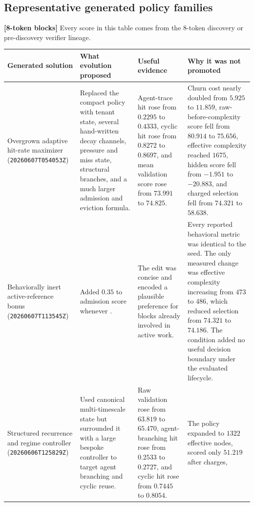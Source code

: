 \documentclass[11pt]{article}
\newcommand{\code}[1]{\texttt{\detokenize{#1}}}
\newcommand{\identifier}[1]{\nolinkurl{#1}}
\newcommand{\blocktag}[1]{\textbf{\color{navy}[#1-token blocks]}}
\begin{document}
\subsection{Representative generated policy families}

\blocktag{8} Every score in this table comes from the 8-token discovery or
pre-discovery verifier lineage.

\begin{center}
\footnotesize
\begin{tabularx}{\textwidth}{@{}>{\raggedright\arraybackslash}p{}
  >{\raggedright\arraybackslash}X
  >{\raggedright\arraybackslash}X
  >{\raggedright\arraybackslash}X@{}}
\toprule
\textbf{Generated solution} & \textbf{What evolution proposed} &
\textbf{Useful evidence} & \textbf{Why it was not promoted} \\
\midrule
Overgrown adaptive hit-rate maximizer
(\identifier{20260607T054053Z}) &
Replaced the compact policy with tenant state, several hand-written decay channels,
pressure and miss state, structural branches, and a much larger admission and eviction
formula. &
Agent-trace hit rose from \(0.2295\) to \(0.4333\), cyclic hit rose from \(0.8272\) to
\(0.8697\), and mean validation score rose from \(73.991\) to \(74.825\). &
Churn cost nearly doubled from \(5.925\) to \(11.859\), raw-before-complexity score
fell from \(80.914\) to \(75.656\), effective complexity reached \(1675\), hidden score
fell from \(-1.951\) to \(-20.883\), and charged selection fell from \(74.321\) to
\(58.638\). \\
\addlinespace
Behaviorally inert active-reference bonus
(\identifier{20260607T113545Z}) &
Added \(0.35\) to admission score whenever \code{active_ref_count > 0}. &
The edit was concise and encoded a plausible preference for blocks already involved in
active work. &
Every reported behavioral metric was identical to the seed.  The only measured change
was effective complexity increasing from \(473\) to \(486\), which reduced selection
from \(74.321\) to \(74.186\).  The condition added no useful decision boundary under
the evaluated lifecycle. \\
\addlinespace
Structured recurrence and regime controller
(\identifier{20260606T125829Z}) &
Used canonical multi-timescale state but surrounded it with a large bespoke controller
to target agent branching and cyclic reuse. &
Raw validation rose from \(63.819\) to \(65.470\), agent-branching hit rose from
\(0.2533\) to \(0.2727\), and cyclic hit rose from \(0.7445\) to \(0.8054\). &
The policy expanded to \(1322\) effective nodes, scored only \(51.219\) after charges,

\end{tabularx}
\end{center}
\end{document}
